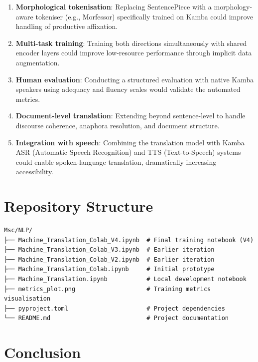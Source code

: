 \documentclass[12pt,a4paper]{article}
\begin{document}
\begin{enumerate}[resume]
    \item \textbf{Morphological tokenisation}: Replacing SentencePiece with a morphology-aware tokeniser (e.g., Morfessor) specifically trained on Kamba could improve handling of productive affixation.
    
    \item \textbf{Multi-task training}: Training both directions simultaneously with shared encoder layers could improve low-resource performance through implicit data augmentation.
    
    \item \textbf{Human evaluation}: Conducting a structured evaluation with native Kamba speakers using adequacy and fluency scales would validate the automated metrics.
    
    \item \textbf{Document-level translation}: Extending beyond sentence-level to handle discourse coherence, anaphora resolution, and document structure.
    
    \item \textbf{Integration with speech}: Combining the translation model with Kamba ASR (Automatic Speech Recognition) and TTS (Text-to-Speech) systems could enable spoken-language translation, dramatically increasing accessibility.
\end{enumerate}

\section{Repository Structure}

\begin{verbatim}
Msc/NLP/
├── Machine_Translation_Colab_V4.ipynb  # Final training notebook (V4)
├── Machine_Translation_Colab_V3.ipynb  # Earlier iteration
├── Machine_Translation_Colab_V2.ipynb  # Earlier iteration
├── Machine_Translation_Colab.ipynb     # Initial prototype
├── Machine_Translation.ipynb           # Local development notebook
├── metrics_plot.png                    # Training metrics visualisation
├── pyproject.toml                      # Project dependencies
└── README.md                           # Project documentation
\end{verbatim}

\section{Conclusion}
\end{document}

